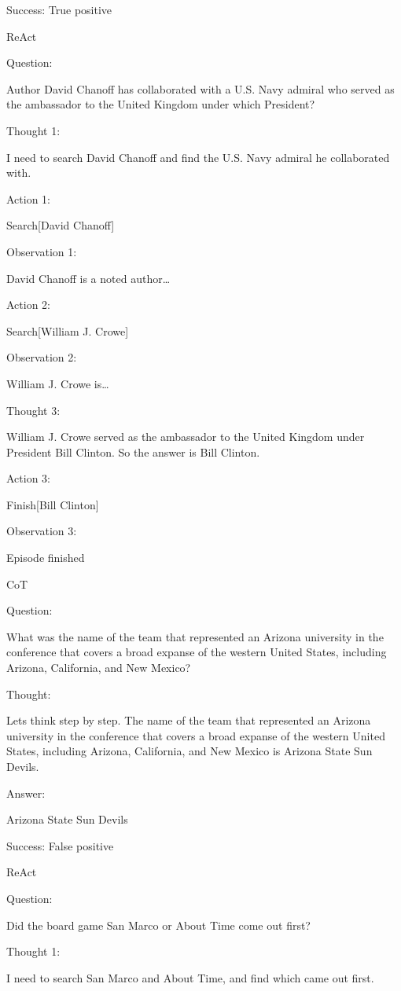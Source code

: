 \documentclass[
]{article}
\begin{document}
Success: True positive

ReAct

Question:

Author David Chanoff has collaborated with a U.S. Navy admiral who
served as the ambassador to the United Kingdom under which President?

Thought 1:

I need to search David Chanoff and find the U.S. Navy admiral he
collaborated with.

Action 1:

Search{[}David Chanoff{]}

Observation 1:

David Chanoff is a noted author\ldots{}

Action 2:

Search{[}William J. Crowe{]}

Observation 2:

William J. Crowe is\ldots{}

Thought 3:

William J. Crowe served as the ambassador to the United Kingdom under
President Bill Clinton. So the answer is Bill Clinton.

Action 3:

Finish{[}Bill Clinton{]}

Observation 3:

Episode finished

CoT

Question:

What was the name of the team that represented an Arizona university in
the conference that covers a broad expanse of the western United States,
including Arizona, California, and New Mexico?

Thought:

Let\textquotesingle s think step by step. The name of the team that
represented an Arizona university in the conference that covers a broad
expanse of the western United States, including Arizona, California, and
New Mexico is Arizona State Sun Devils.

Answer:

Arizona State Sun Devils

Success: False positive

ReAct

Question:

Did the board game San Marco or About Time come out first?

Thought 1:

I need to search San Marco and About Time, and find which came out
first.
\end{document}
